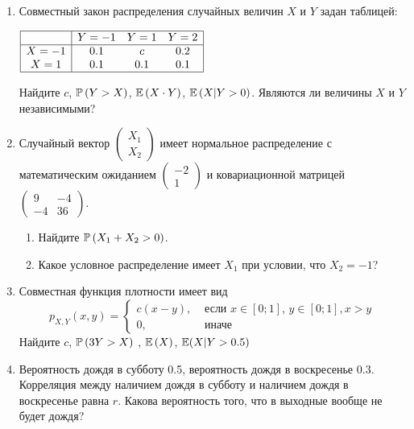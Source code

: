 \documentclass[12pt, a4paper]{article}\usepackage[]{graphicx}\usepackage[]{color}
\begin{document}
\begin{enumerate}

\item Совместный закон распределения случайных величин  $X$  и  $Y$
задан таблицей:

$\begin{array}{|c|ccc|}
\hline
{} & {Y=-1} & {Y=1} & {Y=2}\\
\hline
{X=-1} & {0.1} & {c} & {0.2}\\
{X=1} & {0.1} & {0.1} & {0.1} \\
\hline
\end{array}$

Найдите  $c$,  $\P\left(Y>X\right)$,  $\E\left(X\cdot Y \right)$,  $\E\left(X|Y>0\right)$. Являются ли величины $X$ и $Y$ независимыми?

\item Случайный вектор  $\left(\begin{array}{c}
{X_{1} } \\ {X_{2} }
\end{array}\right)$  имеет нормальное распределение с
математическим ожиданием  $\left(\begin{array}{c} {-2} \\ {1}
\end{array}\right)$  и ковариационной матрицей
$\left(\begin{array}{cc} {9} & {-4} \\ {-4} & {36}
\end{array}\right)$.
\begin{enumerate}
\item Найдите  $\P\left(X_{1} +X_{2} >0\right)$.
\item Какое условное распределение имеет $X_{1}$ при условии, что $X_{2}=-1$?
\end{enumerate}

\item Совместная функция плотности имеет вид
\[
p_{X,Y} \left(x,y\right)=
\begin{cases}
  c(x-y), & \text{ если } x\in \left[0;1\right],\, y\in \left[0;1\right], x>y \\
  0, & \text{ иначе}
\end{cases}
\]
Найдите  $c$, $\P\left(3Y>X\right)$ ,  $\E\left(X\right)$, $\E(X|Y>0.5)$

\item Вероятность дождя в субботу 0.5, вероятность дождя в воскресенье 0.3. Корреляция между наличием дождя в субботу и наличием дождя в воскресенье равна $r$.
Какова вероятность того, что в выходные вообще не будет дождя?


\end{enumerate}
\end{document}
